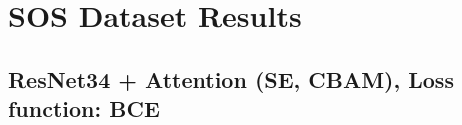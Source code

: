 \documentclass{article}
\begin{document}
\section{SOS Dataset Results}
\subsection{ResNet34 + Attention (SE, CBAM), Loss function: BCE}

\end{document}
